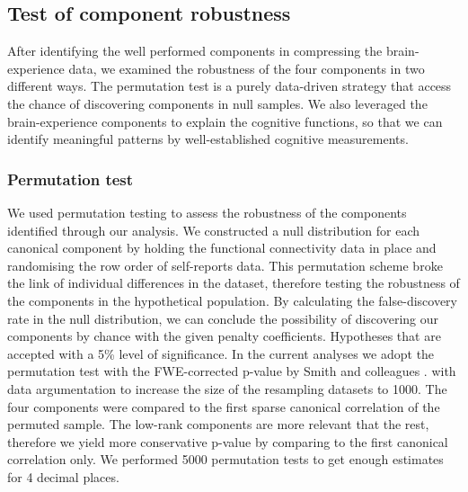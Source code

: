 \subsection{Test of component robustness}
\label{study2:method:robust}
After identifying the well performed components in compressing the brain-experience data, we examined the robustness of the four components in two different ways. The permutation test is a purely data-driven strategy that access the chance of discovering components in null samples. We also leveraged the brain-experience components to explain the cognitive functions, so that we can identify meaningful patterns by well-established cognitive measurements.

\subsubsection{Permutation test}
\label{study2:method:permute}
We used permutation testing to assess the robustness of the components identified through our analysis. We constructed a null distribution for each canonical component by holding the functional connectivity data in place and randomising the row order of self-reports data. This permutation scheme broke the link of individual differences in the dataset, therefore testing the robustness of the components in the hypothetical population. By calculating the false-discovery rate in the null distribution, we can conclude the possibility of discovering our components by chance with the given penalty coefficients. Hypotheses that are accepted with a 5\% level of significance. In the current analyses we adopt the permutation test with the FWE-corrected p-value by Smith and colleagues \citeyear{Smith2015}.
with data argumentation to increase the size of the resampling datasets to 1000. The four components were compared to the first sparse canonical correlation of the permuted sample. The low-rank components are more relevant that the rest, therefore we yield more conservative p-value by comparing to the first canonical correlation only. We performed 5000 permutation tests to get enough estimates for 4 decimal places.


